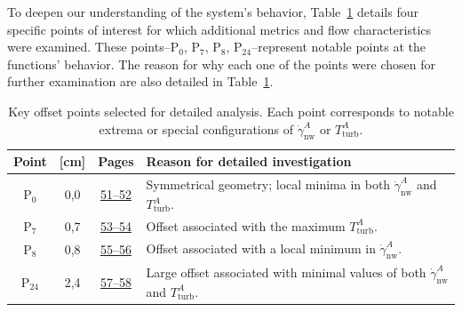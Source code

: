 To deepen our understanding of the system’s behavior, Table~\ref{tab:studied points} details four specific points of interest for which additional metrics and flow characteristics were examined. These points--P$_0$, P$_7$, P$_8$, P$_24$--represent notable points at the functions' behavior. The reason for why each one of the points were chosen for further examination are also detailed in Table~\ref{tab:studied points}.
\vspace{7mm}
\begin{table}[H]
	\bgroup
	\centering
	\setlength\tabcolsep{3mm}
	\def\arraystretch{2.2}%
	\begin{tabular}{|c|c|c|p{8cm}|}
		\hline
		\textbf{Point} & \boldmath{$o_1$} \textbf{[cm]} & \textbf{Pages} & \textbf{Reason for detailed investigation} \\ \hline
		P$_0$ & 0{,}0 & \hyperlink{page.51}{51--52} & Symmetrical geometry; local minima in both $\dot{\gamma}^{A}_{\mathrm{nw}}$ and $T^{A}_{\mathrm{turb}}$. \\ \hline
		P$_7$ & 0{,}7 & \hyperlink{page.53}{53--54} & Offset associated with the maximum $T^{A}_{\mathrm{turb}}$. \\ \hline
		P$_8$ & 0{,}8 & \hyperlink{page.55}{55--56} &  Offset associated with a local minimum in $\dot{\gamma}^{A}_{\mathrm{nw}}$. \\ \hline
		P$_{24}$ & 2{,}4 & \hyperlink{page.57}{57--58} & Large offset associated with minimal values of both $\dot{\gamma}^{A}_{\mathrm{nw}}$ and $T^{A}_{\mathrm{turb}}$. \\ \hline
	\end{tabular}
	 \caption{Key offset points selected for detailed analysis. Each point corresponds to notable extrema or special configurations of $\dot{\gamma}^{A}_{\mathrm{nw}}$ or $T^{A}_{\mathrm{turb}}$.}
	\label{tab:studied points}
	\egroup
\end{table}



